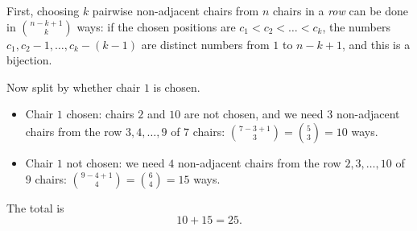 First, choosing $k$ pairwise non-adjacent chairs from $n$ chairs in a \emph{row} can be done in $\binom{n-k+1}{k}$ ways: if the chosen positions are $c_1<c_2<\dots<c_k$, the numbers $c_1,c_2-1,\dots,c_k-(k-1)$ are distinct numbers from $1$ to $n-k+1$, and this is a bijection.

Now split by whether chair $1$ is chosen.
\begin{itemize}
\item Chair $1$ chosen: chairs $2$ and $10$ are not chosen, and we need $3$ non-adjacent chairs from the row $3,4,\dots,9$ of $7$ chairs: $\binom{7-3+1}{3}=\binom53=10$ ways.
\item Chair $1$ not chosen: we need $4$ non-adjacent chairs from the row $2,3,\dots,10$ of $9$ chairs: $\binom{9-4+1}{4}=\binom64=15$ ways.
\end{itemize}
The total is
\[10+15=\boxed{25}.\]
